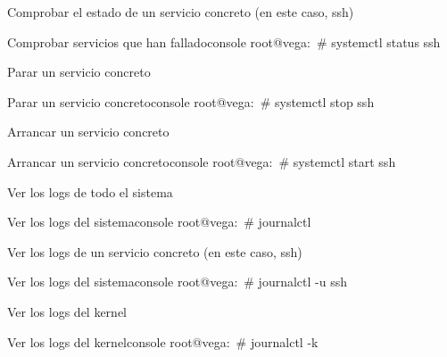 Comprobar el estado de un servicio concreto (en este caso, ssh)
\begin{mycode}{Comprobar servicios que han fallado}{console}{}
root@vega:~# systemctl status ssh
\end{mycode}

Parar un servicio concreto
\begin{mycode}{Parar un servicio concreto}{console}{}
root@vega:~# systemctl stop ssh
\end{mycode}

Arrancar un servicio concreto
\begin{mycode}{Arrancar un servicio concreto}{console}{}
root@vega:~# systemctl start ssh
\end{mycode}

Ver los logs de todo el sistema
\begin{mycode}{Ver los logs del sistema}{console}{}
root@vega:~# journalctl
\end{mycode}

Ver los logs de un servicio concreto (en este caso, ssh)
\begin{mycode}{Ver los logs del sistema}{console}{}
root@vega:~# journalctl -u ssh
\end{mycode}

Ver los logs del kernel
\begin{mycode}{Ver los logs del kernel}{console}{}
root@vega:~# journalctl -k
\end{mycode}